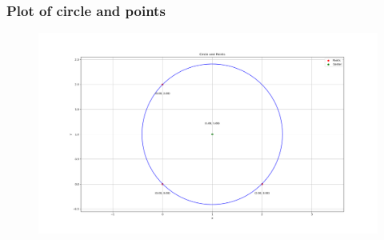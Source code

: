 \documentclass{beamer}
\theoremstyle{remark}
\numberwithin{equation}{section}
\begin{document}
\begin{frame}
\frametitle{Plot of circle and points}
\begin{figure}
    \centering
    \includegraphics[width=0.7\linewidth]{./figs/Figure_1.png}
\end{figure}
\end{frame}
\end{document}
